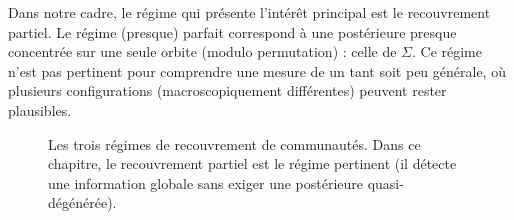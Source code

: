 Dans notre cadre, le régime qui présente l'intérêt principal est le recouvrement partiel. Le régime (presque) parfait correspond à une postérieure presque concentrée sur une seule orbite (modulo permutation) : celle de $\Sigma$. Ce régime n'est pas pertinent pour comprendre une mesure de  \cite{Reichardt2006} un tant soit peu générale, où plusieurs configurations (macroscopiquement différentes) peuvent rester plausibles. 



\begin{figure}[H]
\centering
{}
\caption{Les trois régimes de recouvrement de communautés. Dans ce chapitre, le recouvrement partiel est le régime pertinent (il détecte une information globale sans exiger une postérieure quasi-dégénérée).}
\label{fig:chapII_recovery_regimes}
\end{figure}

